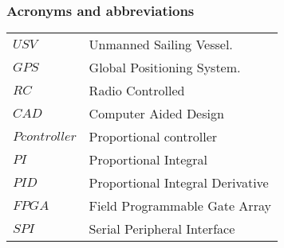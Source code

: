 \subsubsection*{Acronyms and abbreviations}

\begingroup
\renewcommand{\arraystretch}{1.2}
\begin{tabular}{@{}p{2.5cm} l}
    $USV$ & Unmanned Sailing Vessel. \\
    $GPS$ & Global Positioning System. \\
    $RC$ & Radio Controlled \\
    $CAD$ & Computer Aided Design \\
    $P controller$ & Proportional controller \\
    $PI$ & Proportional Integral \\
    $PID$ & Proportional Integral Derivative \\
    $FPGA$ & Field Programmable Gate Array \\
    $SPI$ & Serial Peripheral Interface \\
\end{tabular}
\endgroup
